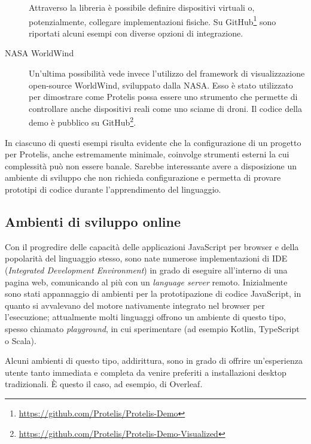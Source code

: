 \begin{description}
      Attraverso la libreria è possibile definire dispositivi virtuali o, potenzialmente, collegare implementazioni fisiche.
      Su GitHub\footnote{\url{https://github.com/Protelis/Protelis-Demo}} sono riportati alcuni esempi con diverse opzioni di integrazione.

    \item[NASA WorldWind]\cite{4161692}
      Un'ultima possibilità vede invece l'utilizzo del framework di visualizzazione open-source WorldWind, sviluppato dalla NASA\@.
      Esso è stato utilizzato per dimostrare come Protelis possa essere uno strumento che permette di controllare anche dispositivi reali come uno sciame di droni.
      Il codice della demo è pubblico su GitHub\footnote{\url{https://github.com/Protelis/Protelis-Demo-Visualized}}.
  \end{description}

  In ciascuno di questi esempi risulta evidente che la configurazione di un progetto per Protelis, anche estremamente minimale, coinvolge strumenti esterni la cui complessità può non essere banale.
  Sarebbe interessante avere a disposizione un ambiente di sviluppo che non richieda configurazione e permetta di provare prototipi di codice durante l'apprendimento del linguaggio.

  \subsection{Ambienti di sviluppo online}\label{subsec:online-ide}

  Con il progredire delle capacità delle applicazioni JavaScript per browser e della popolarità del linguaggio stesso, sono nate numerose implementazioni di IDE (\emph{Integrated Development Environment}) in grado di eseguire all'interno di una pagina web, comunicando al più con un \emph{language server} remoto.
  Inizialmente sono stati appannaggio di ambienti per la prototipazione di codice JavaScript, in quanto si avvalevano del motore nativamente integrato nel browser per l'esecuzione;
  attualmente molti linguaggi offrono un ambiente di questo tipo, spesso chiamato \emph{playground}, in cui sperimentare (ad esempio Kotlin, TypeScript o Scala).

  Alcuni ambienti di questo tipo, addirittura, sono in grado di offrire un'esperienza utente tanto immediata e completa da venire preferiti a installazioni desktop tradizionali.
  È questo il caso, ad esempio, di Overleaf. 

